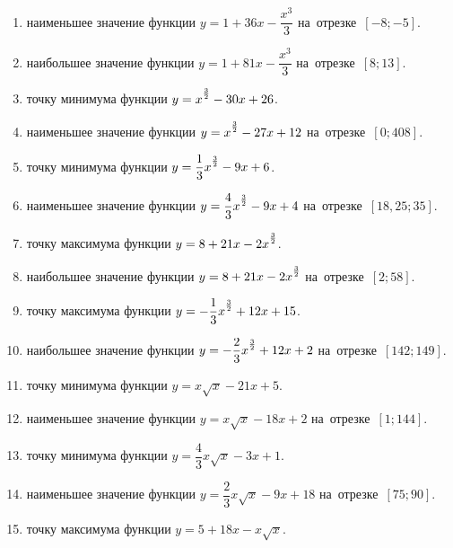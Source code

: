 \documentclass[a4paper,10pt]{article}
\begin{document}
\begin{enumerate}
\item {} наименьшее значение функции $y=1 +36x-\dfrac{x^3}{3}$ на~отрезке~$\left[-8;-5\right]$.

\item {} наибольшее значение функции $y=1 +81x-\dfrac{x^3}{3}$ на~отрезке~$\left[8;13\right]$.

\item {} точку минимума функции $y=x\strut^{\frac{3}{2}} -30x+26$.

\item {} наименьшее значение функции $y=x\strut^{\frac{3}{2}} -27x+12$ на~отрезке~$\left[0;408\right]$.

\item {} точку минимума функции $y=\dfrac{1}{3}x\strut^{\frac{3}{2}} -9x+6$.

\item {} наименьшее значение функции $y=\dfrac{4}{3}x\strut^{\frac{3}{2}} -9x+4$ на~отрезке~$\left[18,25;35\right]$.

\item {} точку максимума функции $y=8+21x-2x\strut^{\frac{3}{2}}$.

\item {} наибольшее значение функции $y=8+21x-2x\strut^{\frac{3}{2}}$ на~отрезке~$\left[2;58\right]$.

\item {} точку максимума функции $y=-\dfrac{1}{3}x\strut^{\frac{3}{2}} +12x+15$.

\item {} наибольшее значение функции $y=-\dfrac{2}{3}x\strut^{\frac{3}{2}} +12x+2$ на~отрезке~$\left[142;149\right]$.

\item {} точку минимума функции $y=x\sqrt{x} -21x+5$.

\item {} наименьшее значение функции $y=x\sqrt{x} -18x+2$ на~отрезке~$\left[1;144\right]$.

\item {} точку минимума функции $y=\dfrac{4}{3}x\sqrt{x} -3x+1$.

\item {} наименьшее значение функции $y=\dfrac{2}{3}x\sqrt{x} -9x+18$ на~отрезке~$\left[75;90\right]$.

\item {} точку максимума функции $y=5+18x -x\sqrt{x}$.


\end{enumerate}
\end{document}
